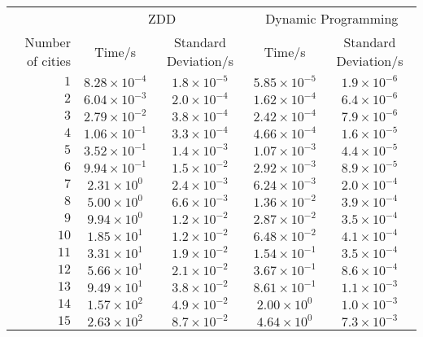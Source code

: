 \documentclass[12pt,a4paper,twoside,openright]{report}
\begin{document}
\begin{table}[h]
\centering
\begin{tabular}[h]{r | c c | c c}
 & \multicolumn{2}{|c|}{ZDD} & \multicolumn{2}{|c}{Dynamic Programming} \\
\parbox[b]{1.5cm}{Number of cities} & Time/s & Standard Deviation/s & Time/s & Standard Deviation/s \\
\hline
 $ 1$ &  $8.28\times 10^{-4}$ &  $1.8\times 10^{-5}$ &  $5.85\times 10^{-5}$ &  $1.9\times 10^{-6}$ \\
 $ 2$ &  $6.04\times 10^{-3}$ &  $2.0\times 10^{-4}$ &  $1.62\times 10^{-4}$ &  $6.4\times 10^{-6}$ \\
 $ 3$ &  $2.79\times 10^{-2}$ &  $3.8\times 10^{-4}$ &  $2.42\times 10^{-4}$ &  $7.9\times 10^{-6}$ \\
 $ 4$ &  $1.06\times 10^{-1}$ &  $3.3\times 10^{-4}$ &  $4.66\times 10^{-4}$ &  $1.6\times 10^{-5}$ \\
 $ 5$ &  $3.52\times 10^{-1}$ &  $1.4\times 10^{-3}$ &  $1.07\times 10^{-3}$ &  $4.4\times 10^{-5}$ \\
 $ 6$ &  $9.94\times 10^{-1}$ &  $1.5\times 10^{-2}$ &  $2.92\times 10^{-3}$ &  $8.9\times 10^{-5}$ \\
 $ 7$ &  $2.31\times 10^{ 0}$ &  $2.4\times 10^{-3}$ &  $6.24\times 10^{-3}$ &  $2.0\times 10^{-4}$ \\
 $ 8$ &  $5.00\times 10^{ 0}$ &  $6.6\times 10^{-3}$ &  $1.36\times 10^{-2}$ &  $3.9\times 10^{-4}$ \\
 $ 9$ &  $9.94\times 10^{ 0}$ &  $1.2\times 10^{-2}$ &  $2.87\times 10^{-2}$ &  $3.5\times 10^{-4}$ \\
 $10$ &  $1.85\times 10^{ 1}$ &  $1.2\times 10^{-2}$ &  $6.48\times 10^{-2}$ &  $4.1\times 10^{-4}$ \\
 $11$ &  $3.31\times 10^{ 1}$ &  $1.9\times 10^{-2}$ &  $1.54\times 10^{-1}$ &  $3.5\times 10^{-4}$ \\
 $12$ &  $5.66\times 10^{ 1}$ &  $2.1\times 10^{-2}$ &  $3.67\times 10^{-1}$ &  $8.6\times 10^{-4}$ \\
 $13$ &  $9.49\times 10^{ 1}$ &  $3.8\times 10^{-2}$ &  $8.61\times 10^{-1}$ &  $1.1\times 10^{-3}$ \\
 $14$ &  $1.57\times 10^{ 2}$ &  $4.9\times 10^{-2}$ &  $2.00\times 10^{ 0}$ &  $1.0\times 10^{-3}$ \\
 $15$ &  $2.63\times 10^{ 2}$ &  $8.7\times 10^{-2}$ &  $4.64\times 10^{ 0}$ &  $7.3\times 10^{-3}$
\end{tabular}
\caption{}
\label{timeResults}
\end{table}
\end{document}
